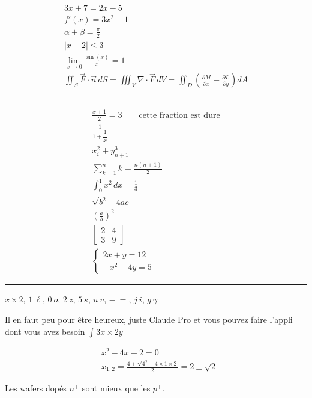 \documentclass[11pt]{article}
\begin{document}
\begin{gather*}
3x + 7 = 2x - 5 \\[6pt]
f'(x) = 3x^2 + 1 \\[6pt]
\alpha + \beta = \frac{\pi}{2} \\[6pt]
|x - 2| \leq 3 \\[6pt]
\lim_{x \to 0} \frac{\sin(x)}{x} = 1 \\[6pt]
\iint_S \vec{F} \cdot \vec{n} \, dS
= \iiint_V \nabla \cdot \vec{F} \, dV
= \iint_D \left( \frac{\partial M}{\partial x} - \frac{\partial L}{\partial y} \right) dA
\end{gather*}

\noindent\rule{\linewidth}{0.4pt}

\begin{gather*}
\frac{x+1}{2} = 3 \qquad \text{cette fraction est dure} \\[6pt]
\frac{1}{1 + \dfrac{1}{x}} \\[6pt]
x_i^2 + y_{n+1}^3 \\[6pt]
\sum_{k=1}^{n} k = \frac{n(n+1)}{2} \\[6pt]
\int_0^1 x^2 \, dx = \frac{1}{3} \\[6pt]
\sqrt{b^2 - 4ac} \\[6pt]
\left( \frac{a}{b} \right)^2 \\[6pt]
\begin{bmatrix} 2 & 4 \\ 3 & 9 \end{bmatrix} \\[6pt]
\begin{cases} 2x + y = 12 \\ -x^2 - 4y = 5 \end{cases}
\end{gather*}

\noindent\rule{\linewidth}{0.4pt}

\begin{center}
$x \times 2$, \quad $1\ \ell$, \quad $0\ o$, \quad $2\ z$, \quad $5\ s$, \quad
$u\ v$, \quad $-\ =$, \quad $j\ i$, \quad $g\ \gamma$
\end{center}

\medskip
Il en faut peu pour être heureux, juste Claude Pro et vous pouvez faire l'appli dont vous avez besoin
$\displaystyle\int 3x \times 2y$

\begin{align*}
& x^2 - 4x + 2 = 0 \\
& x_{1,2} = \frac{4 \pm \sqrt{4^2 - 4 \times 1 \times 2}}{2} = 2 \pm \sqrt{2}
\end{align*}

Les wafers dopés $n^+$ sont mieux que les $p^+$.
\end{document}
